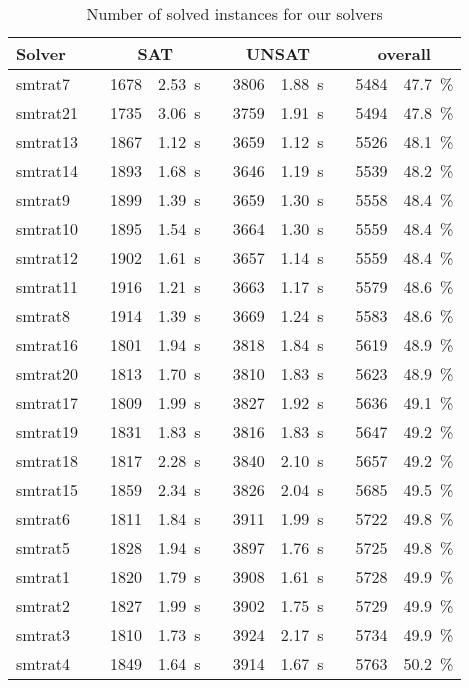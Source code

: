 \begin{table}[]
    \caption{Number of solved instances for our solvers}
    \centering
    \begin{tabularx}{\textwidth}{lXrrXrrXrr}
    	\toprule
    	\textbf{Solver}
    	&& \multicolumn{2}{c}{\textbf{SAT}}
    	&& \multicolumn{2}{c}{\textbf{UNSAT}}
    	&& \multicolumn{2}{c}{\textbf{overall}}
    	\\
    	\midrule
    	smtrat7
    	&& 1678 & 2.53~s
    	&& 3806 & 1.88~s
    	&& 5484 & 47.7~\%
    	\\
    	smtrat21
    	&& 1735 & 3.06~s
    	&& 3759 & 1.91~s
    	&& 5494 & 47.8~\%
    	\\
    	smtrat13
    	&& 1867 & 1.12~s
    	&& 3659 & 1.12~s
    	&& 5526 & 48.1~\%
    	\\
    	smtrat14
    	&& 1893 & 1.68~s
    	&& 3646 & 1.19~s
    	&& 5539 & 48.2~\%
    	\\
    	smtrat9
    	&& 1899 & 1.39~s
    	&& 3659 & 1.30~s
    	&& 5558 & 48.4~\%
    	\\
    	smtrat10
    	&& 1895 & 1.54~s
    	&& 3664 & 1.30~s
    	&& 5559 & 48.4~\%
    	\\
    	smtrat12
    	&& 1902 & 1.61~s
    	&& 3657 & 1.14~s
    	&& 5559 & 48.4~\%
    	\\
    	smtrat11
    	&& 1916 & 1.21~s
    	&& 3663 & 1.17~s
    	&& 5579 & 48.6~\%
    	\\
    	smtrat8
    	&& 1914 & 1.39~s
    	&& 3669 & 1.24~s
    	&& 5583 & 48.6~\%
    	\\
    	smtrat16
    	&& 1801 & 1.94~s
    	&& 3818 & 1.84~s
    	&& 5619 & 48.9~\%
    	\\
    	smtrat20
    	&& 1813 & 1.70~s
    	&& 3810 & 1.83~s
    	&& 5623 & 48.9~\%
    	\\
    	smtrat17
    	&& 1809 & 1.99~s
    	&& 3827 & 1.92~s
    	&& 5636 & 49.1~\%
    	\\
    	smtrat19
    	&& 1831 & 1.83~s
    	&& 3816 & 1.83~s
    	&& 5647 & 49.2~\%
    	\\
    	smtrat18
    	&& 1817 & 2.28~s
    	&& 3840 & 2.10~s
    	&& 5657 & 49.2~\%
    	\\
    	smtrat15
    	&& 1859 & 2.34~s
    	&& 3826 & 2.04~s
    	&& 5685 & 49.5~\%
    	\\
    	smtrat6
    	&& 1811 & 1.84~s
    	&& 3911 & 1.99~s
    	&& 5722 & 49.8~\%
    	\\
    	smtrat5
    	&& 1828 & 1.94~s
    	&& 3897 & 1.76~s
    	&& 5725 & 49.8~\%
    	\\
    	smtrat1
    	&& 1820 & 1.79~s
    	&& 3908 & 1.61~s
    	&& 5728 & 49.9~\%
    	\\
    	smtrat2
    	&& 1827 & 1.99~s
    	&& 3902 & 1.75~s
    	&& 5729 & 49.9~\%
    	\\
    	smtrat3
    	&& 1810 & 1.73~s
    	&& 3924 & 2.17~s
    	&& 5734 & 49.9~\%
    	\\
    	smtrat4
    	&& 1849 & 1.64~s
    	&& 3914 & 1.67~s
    	&& 5763 & 50.2~\%
    	\\
    	\bottomrule
    \end{tabularx}
    \label{table:results_our_solvers}
\end{table}

